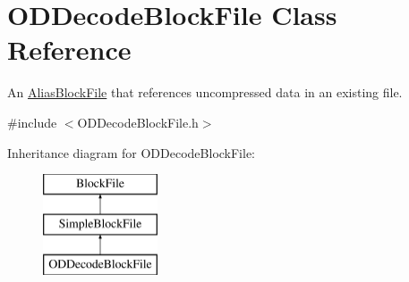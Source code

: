 \hypertarget{class_o_d_decode_block_file}{}\section{O\+D\+Decode\+Block\+File Class Reference}
\label{class_o_d_decode_block_file}


An \hyperlink{class_alias_block_file}{Alias\+Block\+File} that references uncompressed data in an existing file.  




{\ttfamily \#include $<$O\+D\+Decode\+Block\+File.\+h$>$}

Inheritance diagram for O\+D\+Decode\+Block\+File\+:\begin{figure}[H]
\begin{center}
\leavevmode
\includegraphics[height=3.000000cm]{class_o_d_decode_block_file}
\end{center}
\end{figure}
